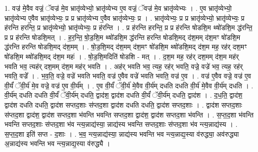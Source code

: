 \documentclass[17pt]{extarticle}
\begin{document}
1. वज्र॑ मे॒वैव वज्रं॒ ॅवज्र॑ मे॒व भ्रातृ॑व्येभ्यो॒ भ्रातृ॑व्येभ्य ए॒व वज्रं॒ ॅवज्र॑ मे॒व भ्रातृ॑व्येभ्यः । . ए॒व भ्रातृ॑व्येभ्यो॒ भ्रातृ॑व्येभ्य ए॒वैव भ्रातृ॑व्येभ्यः॒ प्र प्र भ्रातृ॑व्येभ्य ए॒वैव भ्रातृ॑व्येभ्यः॒ प्र । . भ्रातृ॑व्येभ्यः॒ प्र प्र भ्रातृ॑व्येभ्यो॒ भ्रातृ॑व्येभ्यः॒ प्र ह॑रन्ति हरन्ति॒ प्र भ्रातृ॑व्येभ्यो॒ भ्रातृ॑व्येभ्यः॒ प्र ह॑रन्ति । . प्र ह॑रन्ति हरन्ति॒ प्र प्र ह॑रन्ति षोडशि॒म थ्षो॑डशि॒म द्ध॑रन्ति॒ प्र प्र ह॑रन्ति षोडशि॒मत् । . ह॒र॒न्ति॒ षो॒ड॒शि॒म थ्षो॑डशि॒म द्ध॑रन्ति हरन्ति षोडशि॒मद् द॑श॒मम् द॑श॒मꣳ षो॑डशि॒म
द्ध॑रन्ति हरन्ति षोडशि॒मद् द॑श॒मम् । . षो॒ड॒शि॒मद् द॑श॒मम् द॑श॒मꣳ षो॑डशि॒म थ्षो॑डशि॒मद् द॑श॒म मह॒ रह॑र् दश॒मꣳ षो॑डशि॒म थ्षो॑डशि॒मद् द॑श॒म महः॑ । . षो॒ड॒शि॒मदिति॑ षोडशि - मत् । . द॒श॒म मह॒ रह॑र् दश॒मम् द॑श॒म मह॑र् भवति भव॒ त्यह॑र् दश॒मम् द॑श॒म मह॑र् भवति । . अह॑र् भवति भव॒ त्यह॒ रह॑र् भवति॒ वज्रे॒ वज्रे॑ भव॒ त्यह॒ रह॑र् भवति॒ वज्रे᳚ । . भ॒व॒ति॒ वज्रे॒ वज्रे॑ भवति भवति॒ वज्र॑ ए॒वैव वज्रे॑ भवति भवति॒ वज्र॑ ए॒व । . वज्र॑ ए॒वैव वज्रे॒ वज्र॑ ए॒व वी॒र्यं॑ ॅवी॒र्य॑ मे॒व वज्रे॒ वज्र॑ ए॒व वी॒र्य᳚म् । . ए॒व वी॒र्यं॑ ॅवी॒र्य॑ मे॒वैव वी॒र्य॑म् दधति दधति वी॒र्य॑ मे॒वैव वी॒र्य॑म् दधति । . वी॒र्य॑म् दधति दधति वी॒र्यं॑ ॅवी॒र्य॑म् दधति॒ द्वाद॑श॒ द्वाद॑श दधति वी॒र्यं॑ ॅवी॒र्य॑म् दधति॒ द्वाद॑श । . द॒ध॒ति॒ द्वाद॑श॒ द्वाद॑श दधति दधति॒ द्वाद॑श सप्तद॒शाः स॑प्तद॒शा द्वाद॑श दधति दधति॒ द्वाद॑श सप्तद॒शाः । . द्वाद॑श सप्तद॒शाः स॑प्तद॒शा द्वाद॑श॒ द्वाद॑श सप्तद॒शा भ॑वन्ति भवन्ति सप्तद॒शा द्वाद॑श॒ द्वाद॑श सप्तद॒शा भ॑वन्ति । . स॒प्त॒द॒शा भ॑वन्ति भवन्ति सप्तद॒शाः स॑प्तद॒शा भ॑व न्त्य॒न्नाद्य॑स्या॒ न्नाद्य॑स्य भवन्ति सप्तद॒शाः स॑प्तद॒शा भ॑व न्त्य॒न्नाद्य॑स्य । . स॒प्त॒द॒शा इति॑ सप्त - द॒शाः । . भ॒व॒ न्त्य॒न्नाद्य॑स्या॒ न्नाद्य॑स्य भवन्ति भव न्त्य॒न्नाद्य॒स्या व॑रुद्ध्या॒ अव॑रुद्ध्या अ॒न्नाद्य॑स्य भवन्ति भव न्त्य॒न्नाद्य॒स्या व॑रुद्ध्यै । \newline
\end{document}
